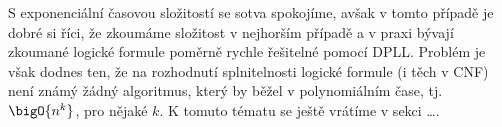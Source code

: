 S exponenciální časovou složitostí se sotva spokojíme, avšak v tomto případě je dobré si říci, že zkoumáme složitost v nejhorším případě a v praxi bývají zkoumané logické formule poměrně rychle řešitelné pomocí DPLL. Problém je však dodnes ten, že na rozhodnutí splnitelnosti logické formule (i těch v CNF) není známý žádný algoritmus, který by běžel v polynomiálním čase, tj. $\bigO{n^k}$, pro nějaké $k$. K tomuto tématu se ještě vrátíme v sekci \dots.


